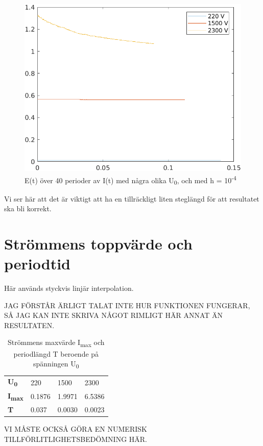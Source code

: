\documentclass[a4paper, titlepage, 11pt]{article}
\begin{document}
\begin{figure}[H]
  \includegraphics[width=\linewidth]{E-bigH.png}
  \caption{E(t) över 40 perioder av I(t) med några olika U\textsubscript{0}, och med h = 10\textsuperscript{-4}}
\end{figure}

Vi ser här att det är viktigt att ha en tillräckligt liten steglängd för att resultatet ska bli korrekt.


\section{Strömmens toppvärde och periodtid}
Här används styckvis linjär interpolation.

JAG FÖRSTÅR ÄRLIGT TALAT INTE HUR FUNKTIONEN FUNGERAR, SÅ JAG KAN INTE SKRIVA NÅGOT RIMLIGT HÄR ANNAT ÄN RESULTATEN.

\begin{table}[H]
\caption{Strömmens maxvärde I\textsubscript{max} och periodlängd T beroende på spänningen U\textsubscript{0}}
\begin{center}
\begin{tabular}{l|lll}
\hline
\textbf{U\textsubscript{0}}   & 220    & 1500   & 2300   \\
\textbf{I\textsubscript{max}} & 0.1876 & 1.9971 & 6.5386 \\
\textbf{T}    & 0.037  & 0.0030 & 0.0023
\end{tabular}
\end{center}
\end{table}

VI MÅSTE OCKSÅ GÖRA EN NUMERISK TILLFÖRLITLIGHETSBEDÖMNING HÄR.
\end{document}
